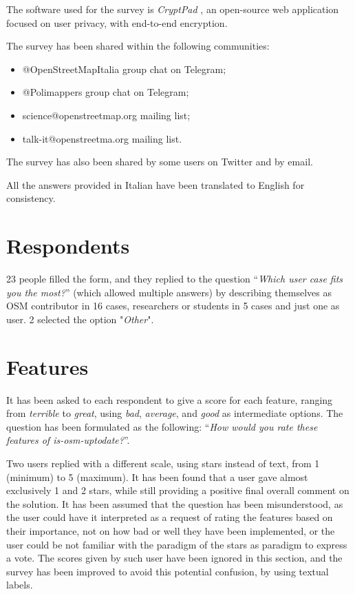 \documentclass{Configuration_Files/PoliMi3i_thesis}
\begin{document}
The software used for the survey is \textit{CryptPad} \cite{CryptPad2022}, an open-source web application focused on user privacy, with end-to-end encryption.

The survey has been shared within the following communities:
\begin{itemize}
\item @OpenStreetMapItalia group chat on Telegram;
\item @Polimappers group chat on Telegram;
\item science@openstreetmap.org mailing list;
\item talk-it@openstreetma.org mailing list.
\end{itemize}

The survey has also been shared by some users on Twitter and by email.

All the answers provided in Italian have been translated to English for consistency.

\section{Respondents}

23 people filled the form, and they replied to the question “\textit{Which user case fits you the most?}” (which allowed multiple answers) by describing themselves as OSM contributor in 16 cases, researchers or students in 5 cases and just one as user. 2 selected the option "\textit{Other}". 

\section{Features}

It has been asked to each respondent to give a score for each feature, ranging from \textit{terrible} to \textit{great}, using \textit{bad}, \textit{average}, and \textit{good} as intermediate options. The question has been formulated as the following: “\textit{How would you rate these features of is-osm-uptodate?}”.

Two users replied with a different scale, using stars instead of text, from 1 (minimum) to 5 (maximum). It has been found that a user gave almost exclusively 1 and 2 stars, while still providing a positive final overall comment on the solution. It has been assumed that the question has been misunderstood, as the user could have it interpreted as a request of rating the features based on their importance, not on how bad or well they have been implemented, or the user could be not familiar with the paradigm of the stars as paradigm to express a vote.
The scores given by such user have been ignored in this section, and the survey has been improved to avoid this potential confusion, by using textual labels.
\end{document}
